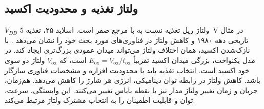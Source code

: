\subsection{ولتاژ تغذیه و محدودیت اکسید}
\(V_{DD}\) ولتاژ ریل تغذیه نسبت به  با مرجع صفر است.
اسلاید ۲۵، تغذیه \qty{5}{\volt} در مثال تاریخی دهه ۱۹۸۰ و کاهش ولتاژ در
فناوری‌های مورد بحث خود را نشان می‌دهد \cite{mos}.
با نازک‌شدن اکسید، همان اختلاف ولتاژ می‌تواند میدان عمودی بزرگ‌تری ایجاد کند.
در مدل یکنواخت، بزرگی میدان اکسید تقریباً \(E_{\mathrm{ox}}=V_{\mathrm{ox}}/t_{\mathrm{ox}}\)
است، که \(V_{\mathrm{ox}}\) ولتاژ دو سوی خود اکسید است.
انتخاب تغذیه باید با محدودیت افزاره و مشخصات فناوری سازگار باشد.
کاهش ولتاژ در رابطه توان دینامیکی، انرژی هر شارژ را کاهش می‌دهد.
هم‌زمان، جریان و زمان تغییر ولتاژ مدار نیز با نقطه بایاس تغییر می‌کنند.
این وابستگی، سرعت، توان و قابلیت اطمینان را به انتخاب مشترک ولتاژ مرتبط می‌کند.
\clearpage
